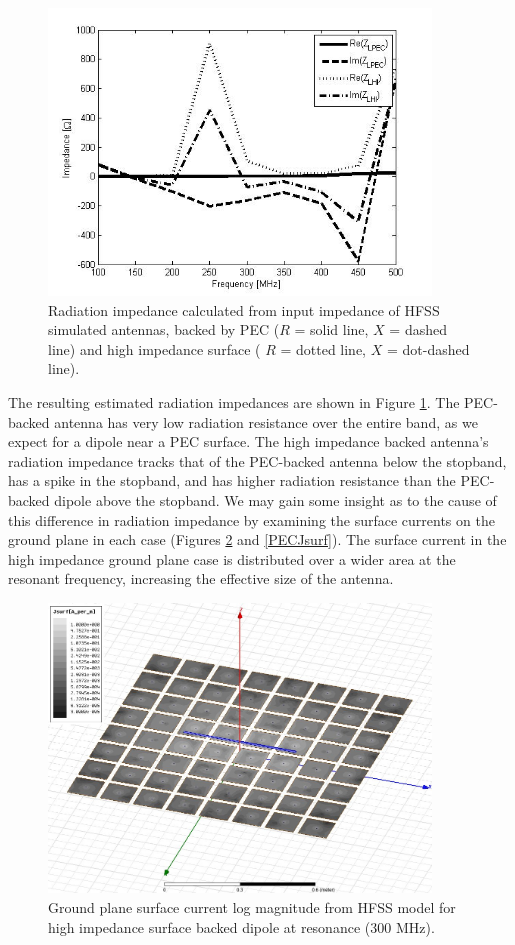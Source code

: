 \documentclass{allertonproc}
\begin{document}
\begin{figure}
\begin{center}
\includegraphics[width=4in]{Ztermgraph}
\caption{Radiation impedance calculated from input impedance of HFSS simulated antennas, backed by PEC ($R$ = solid line, $X$ =  dashed line) and high impedance surface ( $R$ = dotted line, $X$ = dot-dashed line).}
\label{Ztermgraph}
\end{center}
\end{figure}

The resulting estimated radiation impedances are shown in Figure \ref{Ztermgraph}.  The PEC-backed antenna has very low radiation resistance over the entire band, as we expect for a dipole near a PEC surface.  The high impedance backed antenna's radiation impedance tracks that of the PEC-backed antenna below the stopband, has a spike in the stopband, and has higher radiation resistance than the PEC-backed dipole above the stopband.  We may gain some insight as to the cause of this difference in radiation impedance by examining the surface currents on the ground plane in each case (Figures \ref{HIstripJsurf} and \ref{PECJsurf}).  The surface current in the high impedance ground plane case is distributed over a wider area at the resonant frequency, increasing the effective size of the antenna.

\begin{figure}
\begin{center}
\includegraphics[width=4in]{HIstripJsurf}
\caption{Ground plane surface current log magnitude from HFSS model for high impedance surface backed dipole at resonance (300 MHz).}
\label{HIstripJsurf}
\end{center}
\end{figure}
\end{document}
